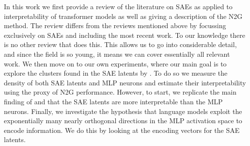 In this work we first provide a review of the literature on \acp{SAE} as applied to interpretability of transformer models as well as giving a description of the \ac{N2G} method.
The review differs from the reviews mentioned above by focussing exclusively on \acp{SAE} and including the most recent work.
To our knowledge there is no other review that does this.
This allows us to go into considerable detail, and since the field is so young, it means we can cover essentially all relevant work.
We then move on to our own experiments, where our main goal is to explore the clusters found in the \ac{SAE} latents by \textcite{bricken_towards_2023}.
To do so we measure the density of both \ac{SAE} latents and \ac{MLP} neurons and estimate their interpretability using the proxy of \ac{N2G} performance.
However, to start, we replicate the main finding of \textcite{bricken_towards_2023} and \textcite{cunningham_sparse_2023} that the \ac{SAE} latents are more interpretable than the \ac{MLP} neurons.
Finally, we investigate the hypothesis that language models exploit the exponentially many nearly orthogonal directions in the \ac{MLP} activation space to encode information.
We do this by looking at the encoding vectors for the \ac{SAE} latents.
